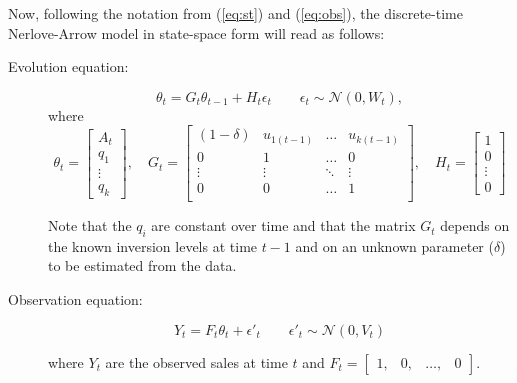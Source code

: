 Now, following the notation from (\ref{eq:st}) and (\ref{eq:obs}), the discrete-time Nerlove-Arrow model in state-space form will read as follows:
\begin{description}

\item[Evolution equation:]

\begin{equation} \label{eq:NA_st}
\theta_{t} = G_t \theta_{t-1} + H_t \epsilon_t \qquad \epsilon_t \sim \mathcal{N}(0, W_t),   
\end{equation}
\noindent where
\begin{equation*} 
\theta_{t}  = \begin{bmatrix} A_t  \\ q_1 \\  \vdots \\q_k \end{bmatrix}
, \quad
G_t =  \begin{bmatrix}
   (1- \delta) & u_{1(t-1)} &  \ldots & u_{k(t-1)} \\
   0 & 1 &   \ldots & 0 \\
   \vdots  &   \vdots & \ddots & \vdots \\
   0 & 0 &  \ldots & 1 \\
   \end{bmatrix}
, \quad
 H_t =    \begin{bmatrix} 1  \\ 0 \\ \vdots \\ 0 \end{bmatrix}
\end{equation*}


Note that the $q_i$ are constant over time and that the matrix $G_t$ depends on the known inversion levels at time $t-1$ and on an unknown parameter ($\delta$) to be estimated from the data.

 \item[Observation equation:]
 
 \begin{equation} \label{eq:NA_obs}
 Y_t = F_t \theta_t + \epsilon'_t \qquad \epsilon'_t \sim \mathcal{N}(0, V_t)  
 \end{equation}

 
 where $Y_t$ are the observed sales at time $t$ and $F_t = \begin{bmatrix} 1,  & 0 , & \ldots, & 0 \end{bmatrix}$.
\end{description}



